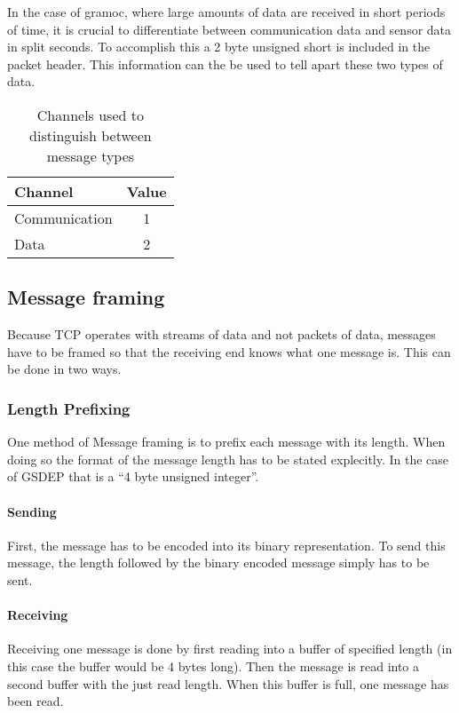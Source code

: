 In the case of gramoc, where large amounts of data are received in short periods of time, it is crucial to differentiate between communication data and sensor data in split seconds. To accomplish this a 2 byte unsigned short is included in the packet header. This information can the be used to tell apart these two types of data.

\begin{table}[!]
	\centering
	\begin{tabular}{| l | c |}
	\hline
	\textbf{Channel} & \textbf{Value} \\ \hline
	Communication & 1 \\ \hline
	Data & 2 \\
	\hline
	\end{tabular}
	\caption{Channels used to distinguish between message types}
	\label{tab:channels}
\end{table}

\subsection{Message framing}
\label{sec:messageframing}
Because TCP operates with streams of data and not packets of data, messages have to be framed so that the receiving end knows what one message is. This can be done in two ways. \cite{MessageFramingCleary,MessageFramingSkotzko}

\subsubsection{Length Prefixing}

One method of Message framing is to prefix each message with its length. When doing so the format of the message length has to be stated explecitly. In the case of GSDEP that is a ``4 byte unsigned integer''.

\paragraph{Sending}

First, the message has to be encoded into its binary representation. To send this message, the length followed by the binary encoded message simply has to be sent.

\paragraph{Receiving}

Receiving one message is done by first reading into a buffer of specified length (in this case the buffer would be 4 bytes long). Then the message is read into a second buffer with the just read length. When this buffer is full, one message has been read.

